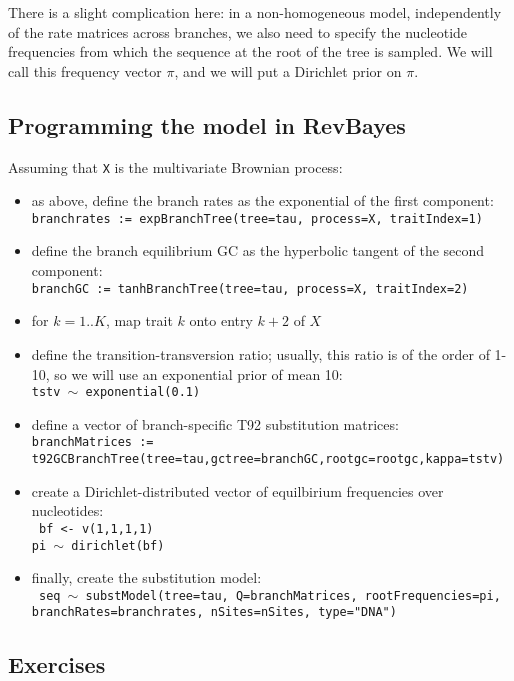 \documentclass[usletter]{article}
\newcommand{\cmd}[1]{\texttt{#1}}
\begin{document}
There is a slight complication here: in a non-homogeneous model, independently of the rate matrices across branches, we also need to specify the nucleotide frequencies from which the sequence at the root of the tree is sampled. We will call this frequency vector $\pi$, and we will put a Dirichlet prior on $\pi$.

\subsection*{Programming the model in RevBayes}

Assuming that \cmd{X} is the multivariate Brownian process:
\begin{itemize}
\item
as above, define the branch rates as the exponential of the first component:
\\
\cmd{branchrates := expBranchTree(tree=tau, process=X, traitIndex=1)}
\item
define the branch equilibrium GC as the hyperbolic tangent of the second component:
\\
\cmd{branchGC := tanhBranchTree(tree=tau, process=X, traitIndex=2)}
\item
for $k=1..K$, map trait $k$ onto entry $k+2$ of $X$
\item
define the transition-transversion ratio; usually, this ratio is of the order of 1-10, so we will use an exponential prior of mean 10:
\\
\cmd{tstv $\sim$ exponential(0.1)}
\item
define a vector of branch-specific T92 substitution matrices:
\\
\cmd{branchMatrices := t92GCBranchTree(tree=tau,gctree=branchGC,rootgc=rootgc,kappa=tstv)}
\item
create a Dirichlet-distributed vector of equilbirium frequencies over nucleotides:
\\
\cmd{
bf <- v(1,1,1,1)
\\
pi $\sim$ dirichlet(bf)
}
\item
finally, create the substitution model:
\\
\cmd{
seq $\sim$ substModel(tree=tau, Q=branchMatrices, rootFrequencies=pi,
\\
branchRates=branchrates, nSites=nSites, type="DNA")
}
\end{itemize}

\subsection*{Exercises}
\end{document}
